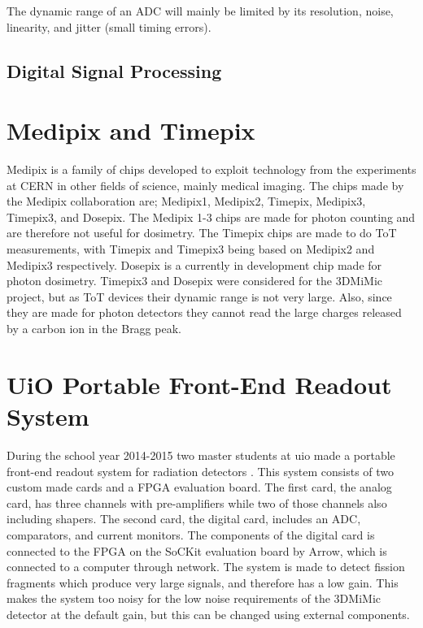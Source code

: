 \documentclass[../main/thesis.tex]{subfiles}
\begin{document}
The dynamic range of an \gls{ADC} will mainly be limited by its resolution, noise, linearity, and jitter (small timing errors). %

\subsection{Digital Signal Processing}
\label{t-dsp}


\section{Medipix and Timepix}
\label{e-medipix}
Medipix is a family of chips developed to exploit technology from the experiments at CERN in other fields of science, mainly medical imaging. The chips made by the Medipix collaboration are; Medipix1, Medipix2, Timepix, Medipix3, Timepix3, and Dosepix. The Medipix 1-3 chips are made for photon counting and are therefore not useful for dosimetry. The Timepix chips are made to do \gls{ToT} measurements, with Timepix and Timepix3 being based on Medipix2 and Medipix3 respectively. Dosepix is a currently in development chip made for photon dosimetry. Timepix3 and Dosepix were considered for the 3DMiMic project, but as \gls{ToT} devices their dynamic range is not very large. Also, since they are made for photon detectors they cannot read the large charges released by a carbon ion in the Bragg peak. 

\section{UiO Portable Front-End Readout System}
\label{e-uio}
During the school year 2014-2015 two master students at \gls{uio} made a portable front-end readout system for radiation detectors \citep{tali} \citep{oltedal}. This system consists of two custom made cards and a \gls{FPGA} evaluation board. The first card, the analog card, has three channels with pre-amplifiers while two of those channels also including shapers. The second card, the digital card, includes an \gls{ADC}, comparators, and current monitors. The components of the digital card is connected to the \gls{FPGA} on the SoCKit evaluation board by Arrow, which is connected to a computer through network. The system is made to detect fission fragments which produce very large signals, and therefore has a low gain. This makes the system too noisy for the low noise requirements of the 3DMiMic detector at the default gain, but this can be changed using external components.
\end{document}
